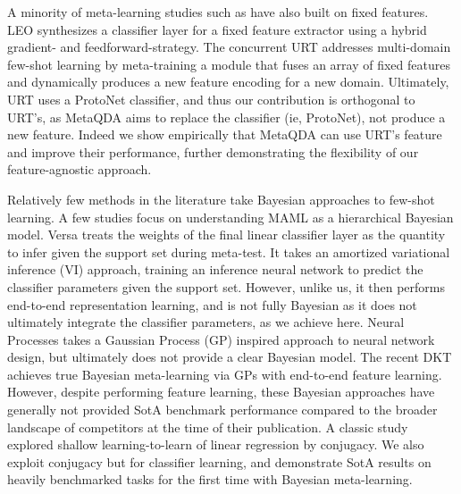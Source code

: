 \documentclass[10pt,twocolumn,letterpaper]{article}
\begin{document}
 A minority of meta-learning studies such as \cite{rusu2019leo,liu2020universal} have also built on fixed features. LEO \cite{rusu2019leo} synthesizes a classifier layer for a fixed feature extractor using a hybrid gradient- and feedforward-strategy. The concurrent URT \cite{liu2020universal} addresses multi-domain few-shot learning by meta-training a module that fuses an array of fixed features and dynamically produces a new feature encoding for a new domain. Ultimately, URT uses a ProtoNet  \cite{snell2017prototypical} classifier, and thus our contribution is orthogonal to URT's, as MetaQDA aims to replace the classifier (ie, ProtoNet), not produce a new feature. Indeed we show empirically that MetaQDA can use URT's feature and improve their performance, further demonstrating the flexibility of our feature-agnostic approach.

Relatively few methods in the literature take Bayesian approaches to few-shot learning. A few studies \cite{grant2018bayesMAML,yoon2018bayesian}  focus on understanding MAML \cite{finn2017model} as a hierarchical Bayesian model. 
Versa \cite{gordon2019metaPred} treats the weights of the final linear classifier layer as the quantity to infer given the support set during meta-test. It takes an amortized variational inference (VI) approach, training an inference neural network to predict the classifier parameters given the support set. However, unlike us, it then performs end-to-end representation learning, and is not fully Bayesian as it does not ultimately integrate the classifier parameters, as we achieve here. Neural Processes \cite{garnelo2018cnp} takes a Gaussian Process (GP) inspired approach to neural network design, but ultimately does not provide a clear Bayesian model. The recent DKT \cite{patacchiola2020bayesian} achieves true Bayesian meta-learning via GPs with end-to-end feature learning. However, despite performing feature learning, these Bayesian approaches have generally not provided SotA benchmark performance compared to the broader landscape of competitors at the time of their publication. A classic study \cite{heskes2000empirical} explored shallow learning-to-learn of linear regression by conjugacy. We also exploit conjugacy but for classifier learning, 
and demonstrate SotA results on heavily benchmarked tasks for the first time with Bayesian meta-learning. 
\end{document}
